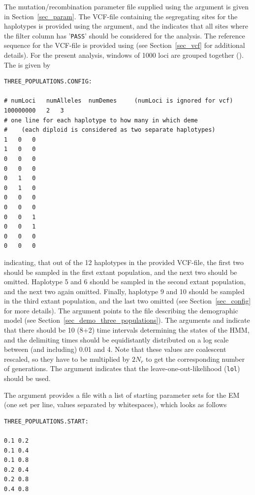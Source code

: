 \documentclass{article}
\numberwithin{equation}{section}
\begin{document}
The mutation/recombination parameter file supplied using the  argument is given in Section~\ref{sec_param}. The VCF-file containing the segregating sites for the haplotypes is provided using the  argument, and the  indicates that all sites where the filter column has '\texttt{PASS}' should be considered for the analysis. The reference sequence for the VCF-file is provided using  (see Section~\ref{sec_vcf} for additional details). For the present analysis, windows of 1000 loci are grouped together (). The  is given by

\begin{verbatim}
THREE_POPULATIONS.CONFIG:

# numLoci	numAlleles	numDemes	 (numLoci is ignored for vcf)
100000000	2	3
# one line for each haplotype to how many in which deme
#    (each diploid is considered as two separate haplotypes)
1	0	0
1	0	0
0	0	0
0	0	0
0	1	0
0	1	0
0	0	0
0	0	0
0	0	1
0	0	1
0	0	0
0	0	0
\end{verbatim}

indicating, that out of the 12 haplotypes in the provided VCF-file, the first two should be sampled in the first extant population, and the next two should be omitted. Haplotype 5 and 6 should be sampled in the second extant population, and the next two again omitted. Finally, haplotype 9 and 10 should be sampled in the third extant population, and the last two omitted (see Section~\ref{sec_config} for more details). The argument  points to the file describing the demographic model (see Section~\ref{sec_demo_three_populations}). The arguments  and  indicate that there should be 10 (8+2) time intervals determining the states of the HMM, and the delimiting times should be equidistantly distributed on a log scale between (and including) 0.01 and 4. Note that these values are coalescent rescaled, so they have to be multiplied by $2N_r$ to get the corresponding number of generations. The argument  indicates that the leave-one-out-likelihood (\texttt{lol}) should be used.

The argument  provides a file with a list of starting parameter sets for the EM (one set per line, values separated by whitespaces), which looks as follows

\begin{verbatim}
THREE_POPULATIONS.START:

0.1	0.2
0.1	0.4
0.1	0.8
0.2	0.4
0.2	0.8
0.4 0.8
\end{verbatim}
\end{document}

